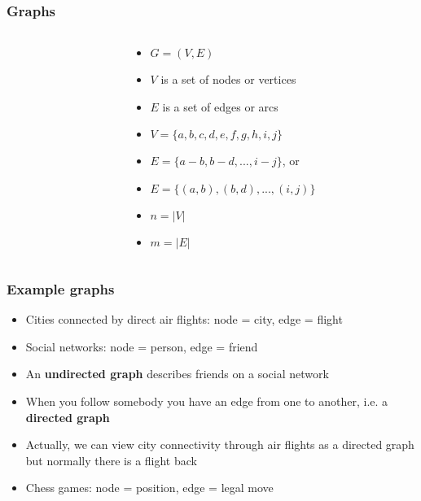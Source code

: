 \documentclass[trans]{beamer}
\begin{document}
\begin{frame}[fragile=singleslide]
\frametitle{Graphs}


\begin{columns}
\begin{column}{5cm}
{\small \tt
{}
}
\end{column}

\begin{column}{6cm}
\begin{itemize}
\item $G = (V,E)$
\item $V$ is a set of nodes or vertices
\item $E$ is a set of edges or arcs
\item $V = \{ a,b,c,d,e,f,g,h,i,j \}$
\item $E = \{ a-b,b-d, ..., i-j \}$, or
\item $E = \{ (a,b), (b,d), ..., (i,j) \}$
\item $n = |V|$
\item $m = |E|$
\end{itemize}
\end{column}
\end{columns}
\end{frame}

\begin{frame}
\frametitle{Example graphs}
\begin{itemize}
\item Cities connected by direct air flights: node = city, edge = flight
\item Social networks: node = person, edge = friend
\item An {\bf undirected graph} describes friends on a social network
\item When you follow somebody you have an edge from one to another, i.e. a {\bf directed graph}
\item Actually, we can view city connectivity through air flights as a directed graph but normally there is a flight back
\item Chess games: node = position, edge = legal move
\end{itemize}
\end{frame}
\end{document}
